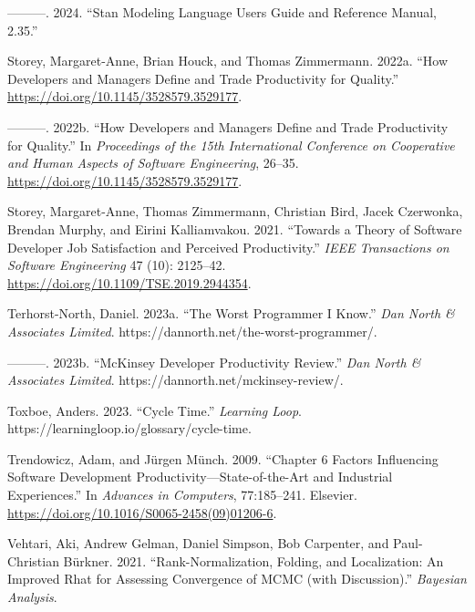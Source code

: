 \documentclass[
]{article}
\newlength{\cslhangindent}
\newenvironment{CSLReferences}[2] %
 {\begin{list}{}{%
  \setlength{\itemindent}{0pt}
  \setlength{\leftmargin}{0pt}
  \setlength{\parsep}{0pt}
  \ifodd #1
   \setlength{\leftmargin}{\cslhangindent}
   \setlength{\itemindent}{-1\cslhangindent}
  \fi
  \setlength{\itemsep}{#2\baselineskip}}}
 {\end{list}}
\begin{document}
\begin{CSLReferences}{1}{0}
---------. 2024. {``Stan {Modeling Language Users Guide} and {Reference
Manual}, 2.35.''}

Storey, Margaret-Anne, Brian Houck, and Thomas Zimmermann. 2022a. {``How
{Developers} and {Managers Define} and {Trade Productivity} for
{Quality}.''} \url{https://doi.org/10.1145/3528579.3529177}.

---------. 2022b. {``How {Developers} and {Managers Define} and {Trade
Productivity} for {Quality}.''} In \emph{Proceedings of the 15th
{International Conference} on {Cooperative} and {Human Aspects} of
{Software Engineering}}, 26--35.
\url{https://doi.org/10.1145/3528579.3529177}.

Storey, Margaret-Anne, Thomas Zimmermann, Christian Bird, Jacek
Czerwonka, Brendan Murphy, and Eirini Kalliamvakou. 2021. {``Towards a
{Theory} of {Software Developer Job Satisfaction} and {Perceived
Productivity}.''} \emph{IEEE Transactions on Software Engineering} 47
(10): 2125--42. \url{https://doi.org/10.1109/TSE.2019.2944354}.

Terhorst-North, Daniel. 2023a. {``The {Worst Programmer I Know}.''}
\emph{Dan North \& Associates Limited}.
https://dannorth.net/the-worst-programmer/.

---------. 2023b. {``{McKinsey Developer Productivity Review}.''}
\emph{Dan North \& Associates Limited}.
https://dannorth.net/mckinsey-review/.

Toxboe, Anders. 2023. {``Cycle {Time}.''} \emph{Learning Loop}.
https://learningloop.io/glossary/cycle-time.

Trendowicz, Adam, and Jürgen Münch. 2009. {``Chapter 6 {Factors
Influencing Software Development Productivity}---{State}-of-the-{Art}
and {Industrial Experiences}.''} In \emph{Advances in {Computers}},
77:185--241. Elsevier.
\url{https://doi.org/10.1016/S0065-2458(09)01206-6}.

Vehtari, Aki, Andrew Gelman, Daniel Simpson, Bob Carpenter, and
Paul-Christian Bürkner. 2021. {``Rank-Normalization, Folding, and
Localization: {An} Improved {Rhat} for Assessing Convergence of {MCMC}
(with Discussion).''} \emph{Bayesian Analysis}.


\end{CSLReferences}
\end{document}
